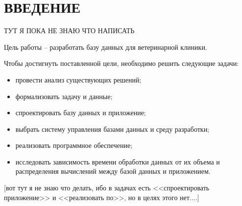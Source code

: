 \section*{ВВЕДЕНИЕ}

ТУТ Я ПОКА НЕ ЗНАЮ ЧТО НАПИСАТЬ

Цель работы -- разработать базу данных для ветеринарной клиники.

Чтобы достигнуть поставленной цели, необходимо решить следующие задачи:
\begin{itemize}[label*=---]
	\item провести анализ существующих решений;
    \item формализовать задачу и данные;
    \item спроектировать базу данных и приложение;
    \item выбрать систему управления базами данных и среду разработки;
    \item реализовать программное обеспечение;
    \item исследовать зависимость времени обработки данных от их объема и распределения вычислений между базой данных и приложением.
\end{itemize}


[вот тут я не знаю что делать, ибо  в задачах есть <<спроектировать приложение>> и <<реализовать по>>, но в целях этого нет....]